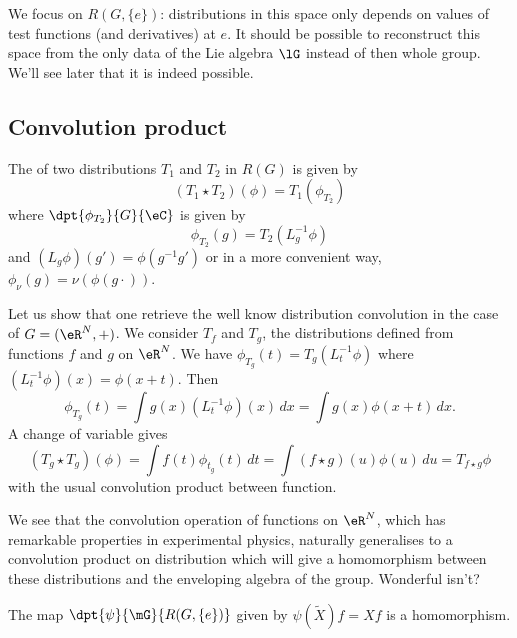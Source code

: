 We focus on $R(G,\{ e \})$: distributions in this space only depends on values of test functions (and derivatives) at $e$. It should be possible to reconstruct this space from the only data of the Lie algebra $\lG$ instead of then whole group. We'll see later that it is indeed possible.

\subsection{Convolution product}

The  of two distributions $T_1$ and $T_2$ in $R(G)$ is given by
\begin{equation}
  (T_1\star T_2)(\phi)=T_1(\phi_{T_2})
\end{equation}
where $\dpt{\phi_{T_2}}{G}{\eC}$ is given by
\begin{equation}
   \phi_{T_2}(g)=T_2(L_g^{-1}\phi)
\end{equation}
and $(L_g\phi)(g')=\phi(g^{-1}g')$ or in a more convenient way, $\phi_{\nu}(g)=\nu(\phi(g\cdot))$.

Let us show that one retrieve the well know distribution convolution in the case of $G=(\eR^N,+)$. We consider $T_f$ and $T_g$, the distributions defined from functions $f$ and $g$ on $\eR^N$. We have $\phi_{T_g}(t)=T_g(L_t^{-1}\phi)$ where $(L_t^{-1}\phi)(x)=\phi(x+t)$. Then
\begin{equation}
  \phi_{T_g}(t)=\int g(x)(L_t^{-1}\phi)(x)\,dx
		=\int g(x)\phi(x+t)\,dx.
\end{equation}
A change of variable gives
\begin{equation}
  (T_g\star T_g)(\phi)=\int f(t)\phi_{t_g}(t)\,dt
		=\int (f\star g)(u)\phi(u)\,du
		= T_{f\star g}\phi
\end{equation}
with the usual convolution product between function.

\begin{remark}
We see that the convolution operation of functions on $\eR^N$, which has remarkable properties in experimental physics, naturally generalises to a convolution product on distribution which will give a homomorphism between these distributions and the enveloping algebra of the group. Wonderful isn't?
\end{remark}

\begin{lemma}
The map $\dpt{\psi}{\mG}{R(G,\{ e \})}$ given by $\psi(\tilde X)f=Xf$ is a homomorphism.
\end{lemma}

